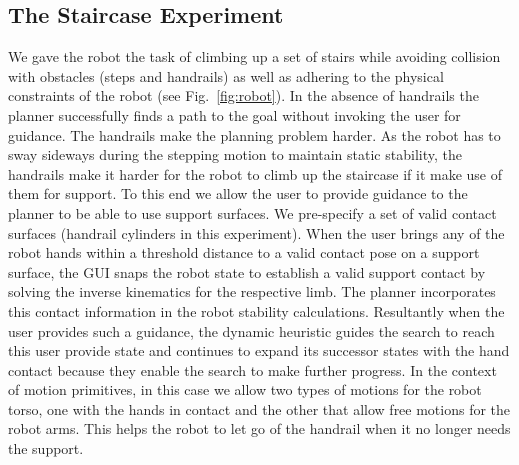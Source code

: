 \documentclass[conference]{IEEEtran}
\begin{document}
\subsection{The Staircase Experiment}
We gave the robot the task of climbing up a set of stairs while avoiding collision with obstacles (steps and handrails) as well as adhering to the physical constraints of the robot (see Fig.~\ref{fig:robot}). In the absence of handrails the planner successfully finds a path to the goal without invoking the user for guidance. The handrails make the planning problem  harder. As the robot has to sway sideways during the stepping motion to maintain static stability, the handrails make it harder for the robot to climb up the staircase if it make use of them for support. To this end we allow the user to provide guidance to the planner to be able to use support surfaces. We pre-specify a set of valid contact surfaces (handrail cylinders in this experiment). When the user brings any of the robot hands within a threshold distance to a valid contact pose on a support surface, the GUI snaps the robot state to establish a valid support contact by solving the inverse kinematics for the respective limb. The planner incorporates this contact information in the robot stability calculations. Resultantly when the user provides such a guidance, the dynamic heuristic guides the search to reach this user provide state and continues to expand its successor states with the hand contact because they enable the search to make further progress. In the context of motion primitives, in this case we allow two types of motions for the robot torso, one with the hands in contact and the other that allow free motions for the robot arms. This helps the robot to let go of the handrail when it no longer needs the support.
\end{document}
